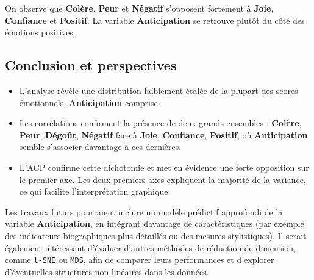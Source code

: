 \documentclass[12pt,a4paper]{article}
\begin{document}
	On observe que \textbf{Colère}, \textbf{Peur} et \textbf{Négatif} s’opposent
	fortement à \textbf{Joie}, \textbf{Confiance} et \textbf{Positif}. La variable
	\textbf{Anticipation} se retrouve plutôt du côté des émotions positives.
	
	\subsection{Conclusion et perspectives}
	\begin{itemize}
		\item L'analyse révèle une distribution faiblement étalée de la plupart
		des scores émotionnels, \textbf{Anticipation} comprise.
		\item Les corrélations confirment la présence de deux grands ensembles :
		\textbf{Colère}, \textbf{Peur}, \textbf{Dégoût}, \textbf{Négatif} 
		face à \textbf{Joie}, \textbf{Confiance}, \textbf{Positif}, où \textbf{Anticipation}
		semble s'associer davantage à ces dernières.
		\item L’ACP confirme cette dichotomie et met en évidence une forte
		opposition sur le premier axe. Les deux premiers axes expliquent
		la majorité de la variance, ce qui facilite l’interprétation graphique.
	\end{itemize}
	
	Les travaux futurs pourraient inclure un modèle prédictif approfondi
	de la variable \textbf{Anticipation}, en intégrant davantage de
	caractéristiques (par exemple des indicateurs biographiques plus détaillés
	ou des mesures stylistiques). Il serait également intéressant d’évaluer
	d’autres méthodes de réduction de dimension, comme \texttt{t-SNE} ou
	\texttt{MDS}, afin de comparer leurs performances et d’explorer
	d’éventuelles structures non linéaires dans les données.
	
\end{document}
